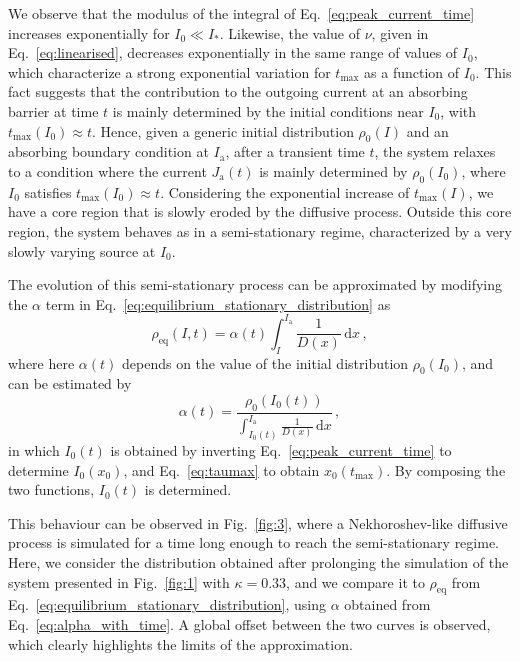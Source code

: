 We observe that the modulus of the integral of Eq.~\eqref{eq:peak_current_time} increases exponentially for $I_0 \ll I_\ast$. Likewise, the value of $\nu$, given in Eq.~\eqref{eq:linearised}, decreases exponentially in the same range of values of $I_0$, which characterize a strong exponential variation for $t_\text{max}$ as a function of $I_0$. This fact suggests that the contribution to the outgoing current at an absorbing barrier at time $t$ is mainly determined by the initial conditions near $I_0$, with $t_\text{max}(I_0) \approx t$. Hence, given a generic initial distribution $\rho_0(I)$ and an absorbing boundary condition at $I_\mathrm{a}$, after a transient time $t$, the system relaxes to a condition where the current $J_\mathrm{a}(t)$ is mainly determined by $\rho_0(I_0)$, where $I_0$ satisfies $t_\text{max}(I_0) \approx t$. Considering the exponential increase of $t_\text{max}(I)$, we have a core region that is slowly eroded by the diffusive process. Outside this core region, the system behaves as in a semi-stationary regime, characterized by a very slowly varying source at $I_0$.

The evolution of this semi-stationary process can be approximated by modifying the $\alpha$ term in Eq.~\eqref{eq:equilibrium_stationary_distribution} as
\begin{equation}
    \rho_\mathrm{eq}(I, t) = \alpha(t) \int_I^{I_\mathrm{a}} \frac{1}{D(x)}\,\mathrm{d}x\,,
    \label{eq:semi_stationary_distribution}
\end{equation}
where here $\alpha(t)$ depends on the value of the initial distribution $\rho_0(I_0)$, and can be estimated by
\begin{equation}
    \alpha(t) = \frac{\rho_0\left(I_0(t)\right)}{\displaystyle{ \int_{I_0(t)}^{I_\mathrm{a}} \frac{1}{D(x)}\,\mathrm{d}x}}\,,
    \label{eq:alpha_with_time}
\end{equation}
in which $I_0(t)$ is obtained by inverting Eq.~\eqref{eq:peak_current_time} to determine $I_0(x_0)$, and Eq.~\eqref{eq:taumax} to obtain $x_0(t_\mathrm{max})$. By composing the two functions, $I_0(t)$ is determined.

This behaviour can be observed in Fig.~\ref{fig:3}, where a Nekhoroshev-like diffusive process is simulated for a time long enough to reach the semi-stationary regime. Here, we consider the distribution obtained after prolonging the simulation of the system presented in Fig.~\ref{fig:1} with $\kappa=0.33$, and we compare it to $\rho_\mathrm{eq}$ from Eq.~\eqref{eq:equilibrium_stationary_distribution}, using $\alpha$ obtained from Eq.~\eqref{eq:alpha_with_time}. A global offset between the two curves is observed, which clearly highlights the limits of the approximation. 

